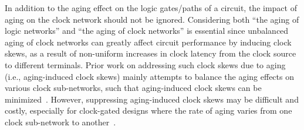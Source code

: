 In addition to the aging effect on the logic gates/paths of a circuit, the impact of aging on the clock network should not be ignored. Considering both \enquote{the aging of logic networks} and \enquote{the aging of clock networks} is essential since unbalanced aging of clock networks can greatly affect circuit performance by inducing clock skews, as a result of non-uniform increases in clock latency from the clock source to different terminals. Prior work on addressing such clock skews due to aging (i.e., aging-induced clock skews) mainly attempts to balance the aging effects on various clock sub-networks, such that aging-induced clock skews can be minimized~\cite{chen2013novel, huang2013low, chakraborty2013skew}. However, suppressing aging-induced clock skews may be difficult and costly, especially for clock-gated designs where the rate of aging varies from one clock sub-network to another~\cite{lai2014bti}.

\begin{comment}
Then think about the following question: if one has to work hard on (and incur significant overhead for) minimizing aging-induced clock skews but it turns out that there still exist stubborn non-zero skews, why don't we try to take advantage of them? We do; we propose to intentionally make clock skews useful for aging tolerance. More specifically, we compensate for the performance degradation (due to aging) of logic networks by exploring \enquote{useful} clock skews, based on the concept of time borrowing. The useful clock skews can be created by the following two idea: (1) Manipulation of aging rates on different clock branches. Note that the rate of aging depends on the stress time, defined as the amount of time during which a PMOS/NMOS transistor is stressed under negative/positive bias. For clock drivers (comprising pairs of inverters), their stress times are proportional to the duty cycle of the clock signal. Therefore, our manipulation of aging rates on clock branches is achieved, by changing the duty cycle of a clock waveform delivered to each of the clock branches. (2) $V_{th}$ assignment for clock buffers. That is, the threshold voltages of certain clock buffers are re-assigned to the other specific value. In this way, the delay of the clock buffers are lengthened, so are the clock latency (from clock source to flip-flops). In this paper, the two idea are utilized together to explore useful clock skews in the clock network, such that aging-induced performance degradation can be tolerated effectively.
\end{comment}

